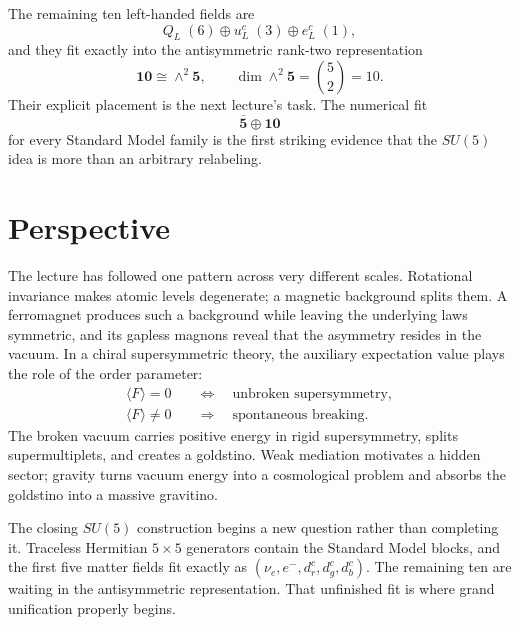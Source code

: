 The remaining ten left-handed fields are
\begin{equation}
Q_L\;(6)
\oplus
u^c_L\;(3)
\oplus
e^c_L\;(1),
\end{equation}
and they fit exactly into the antisymmetric rank-two representation
\begin{equation}
\mathbf{10}\cong\wedge^2\mathbf5,
\qquad
\dim\wedge^2\mathbf5=\binom52=10.
\label{eq:l9-ten-preview}
\end{equation}
Their explicit placement is the next lecture's task. The numerical fit
\begin{equation}
\overline{\mathbf5}\oplus\mathbf{10}
\end{equation}
for every Standard Model family is the first striking evidence that the \(SU(5)\) idea is more than an arbitrary relabeling.

\begin{classroomqa}
\end{classroomqa}

\section{Perspective}

The lecture has followed one pattern across very different scales. Rotational invariance makes atomic levels degenerate; a magnetic background splits them. A ferromagnet produces such a background while leaving the underlying laws symmetric, and its gapless magnons reveal that the asymmetry resides in the vacuum. In a chiral supersymmetric theory, the auxiliary expectation value plays the role of the order parameter:
\begin{equation}
\begin{aligned}
\langle F\rangle=0
&\quad\Longleftrightarrow\quad
\text{unbroken supersymmetry},\\
\langle F\rangle\neq0
&\quad\Longrightarrow\quad
\text{spontaneous breaking}.
\end{aligned}
\end{equation}
The broken vacuum carries positive energy in rigid supersymmetry, splits supermultiplets, and creates a goldstino. Weak mediation motivates a hidden sector; gravity turns vacuum energy into a cosmological problem and absorbs the goldstino into a massive gravitino.

The closing \(SU(5)\) construction begins a new question rather than completing it. Traceless Hermitian \(5\times5\) generators contain the Standard Model blocks, and the first five matter fields fit exactly as
\((\nu_e,e^-,d^c_r,d^c_g,d^c_b)\). The remaining ten are waiting in the antisymmetric representation. That unfinished fit is where grand unification properly begins.
